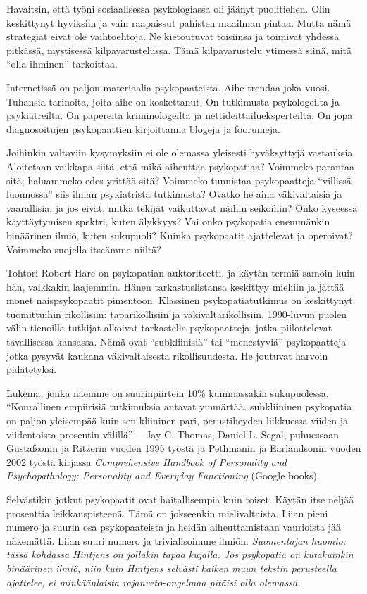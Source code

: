 Havaitsin, että työni sosiaalisessa psykologiassa oli jäänyt puolitiehen. Olin keskittynyt hyviksiin ja vain raapaissut pahisten maailman pintaa. Mutta nämä strategiat eivät ole vaihtoehtoja. Ne kietoutuvat toisiinsa ja toimivat yhdessä pitkässä, mystisessä kilpavarustelussa. Tämä kilpavarustelu ytimessä siinä, mitä ``olla ihminen'' tarkoittaa.

Internetissä on paljon materiaalia psykopaateista. Aihe trendaa joka vuosi. Tuhansia tarinoita, joita aihe on koskettanut. On tutkimusta psykologeilta ja psykiatreilta. On papereita kriminologeilta ja nettideittailueksperteiltä. On jopa diagnosoitujen psykopaattien kirjoittamia blogeja ja foorumeja.

Joihinkin valtaviin kysymyksiin ei ole olemassa yleisesti hyväksyttyjä vastauksia. Aloitetaan vaikkapa siitä, että mikä aiheuttaa psykopatiaa? Voimmeko parantaa sitä; haluammeko edes yrittää sitä? Voimmeko tunnistaa psykopaatteja ``villissä luonnossa\vmq{,}'' siis ilman psykiatrista tutkimusta? Ovatko he aina väkivaltaisia ja vaarallisia, ja jos eivät, mitkä tekijät vaikuttavat näihin seikoihin? Onko kyseessä käyttäytymisen spektri, kuten älykkyys? Vai onko psykopatia enemmänkin binäärinen ilmiö, kuten sukupuoli? Kuinka psykopaatit ajattelevat ja operoivat? Voimmeko suojella itseämme niiltä?

Tohtori Robert Hare on psykopatian auktoriteetti, ja käytän termiä samoin kuin hän, vaikkakin laajemmin. Hänen tarkastuslistansa keskittyy miehiin ja jättää monet naispsykopaatit pimentoon. Klassinen psykopatiatutkimus on keskittynyt tuomittuihin rikollisiin: taparikollisiin ja väkivaltarikollisiin. 1990-luvun puolen välin tienoilla tutkijat alkoivat tarkastella psykopaatteja, jotka piilottelevat tavallisessa kansassa. Nämä ovat ``subkliinisiä'' tai ``menestyviä'' psykopaatteja jotka pysyvät kaukana väkivaltaisesta rikollisuudesta. He joutuvat harvoin pidätetyksi.

Lukema, jonka näemme on suurinpiirtein 10\% kummassakin sukupuolessa. ``Kourallinen empiirisiä tutkimuksia antavat ymmärtää\ldots subkliininen psykopatia on paljon yleisempää kuin sen kliininen pari, perustiheyden liikkuessa viiden ja viidentoista prosentin välillä'' ---Jay C. Thomas, Daniel L. Segal, puhuessaan Gustafsonin ja Ritzerin vuoden 1995 työstä ja Pethmanin ja Earlandsonin vuoden 2002 työstä kirjassa \emph{Comprehensive Handbook of Personality and Psychopathology: Personality and Everyday Functioning} (Google books).

Selvästikin jotkut psykopaatit ovat haitallisempia kuin toiset. Käytän itse neljää prosenttia leikkauspisteenä. Tämä on jokseenkin mielivaltaista. Liian pieni numero ja suurin osa psykopaateista ja heidän aiheuttamistaan vaurioista jää näkemättä. Liian suuri numero ja trivialisoimme ilmiön. \emph{Suomentajan huomio: tässä kohdassa Hintjens on jollakin tapaa kujalla. Jos psykopatia on kutakuinkin binäärinen ilmiö, niin kuin Hintjens selvästi kaiken muun tekstin perusteella ajattelee, ei minkäänlaista rajanveto-ongelmaa pitäisi olla olemassa.}

